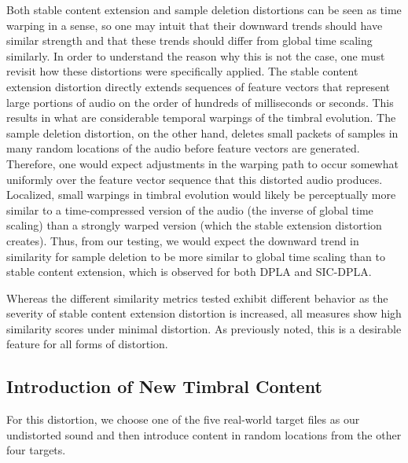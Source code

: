 \documentclass[12pt]{report} 	%
\numberwithin{figure}{chapter}
\numberwithin{table}{chapter}
\numberwithin{equation}{chapter}
\begin{document}
\begin{flushleft}
Both stable content extension and sample deletion distortions can be seen as time warping in a sense, so one may intuit that their downward trends should have similar strength and that these trends should differ from global time scaling similarly. In order to understand the reason why this is not the case, one must revisit how these distortions were specifically applied. The stable content extension distortion directly extends sequences of feature vectors that represent large portions of audio on the order of hundreds of milliseconds or seconds. This results in what are considerable temporal warpings of the timbral evolution. The sample deletion distortion, on the other hand, deletes small packets of samples in many random locations of the audio before feature vectors are generated. Therefore, one would expect adjustments in the warping path to occur somewhat uniformly over the feature vector sequence that this distorted audio produces. Localized, small warpings in timbral evolution would likely be perceptually more similar to a time-compressed version of the audio (the inverse of global time scaling) than a strongly warped version (which the stable extension distortion creates). Thus, from our testing, we would expect the downward trend in similarity for sample deletion to be more similar to global time scaling than to stable content extension, which is observed for both DPLA and SIC-DPLA.

Whereas the different similarity metrics tested exhibit different behavior as the severity of stable content extension distortion is increased, all measures show high similarity scores under minimal distortion. As previously noted, this is a desirable feature for all forms of distortion.

\subsection{Introduction of New Timbral Content}
For this distortion, we choose one of the five real-world target files as our undistorted sound and then introduce content in random locations from the other four targets. 


\end{flushleft}
\end{document}
